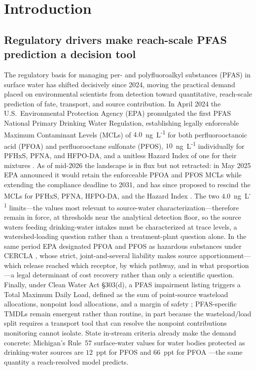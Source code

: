 \section{Introduction}

\subsection{Regulatory drivers make reach-scale PFAS prediction a decision tool}
The regulatory basis for managing per- and polyfluoroalkyl substances (PFAS) in surface water has shifted decisively since 2024, moving the practical demand placed on environmental scientists from detection toward quantitative, reach-scale prediction of fate, transport, and source contribution. In April 2024 the U.S.\ Environmental Protection Agency (EPA) promulgated the first PFAS National Primary Drinking Water Regulation, establishing legally enforceable Maximum Contaminant Levels (MCLs) of $4.0$~ng~L\textsuperscript{-1} for both perfluorooctanoic acid (PFOA) and perfluorooctane sulfonate (PFOS), $10$~ng~L\textsuperscript{-1} individually for PFHxS, PFNA, and HFPO-DA, and a unitless Hazard Index of one for their mixtures \citep[89~Fed.~Reg.~32532;][]{epa2024mcl}. As of mid-2026 the landscape is in flux but not retracted: in May 2025 EPA announced it would retain the enforceable PFOA and PFOS MCLs while extending the compliance deadline to 2031, and has since proposed to rescind the MCLs for PFHxS, PFNA, HFPO-DA, and the Hazard Index \citep{epa2025mcl}. The two $4.0$~ng~L\textsuperscript{-1} limits---the values most relevant to source-water characterization---therefore remain in force, at thresholds near the analytical detection floor, so the source waters feeding drinking-water intakes must be characterized at trace levels, a watershed-loading question rather than a treatment-plant question alone. In the same period EPA designated PFOA and PFOS as hazardous substances under CERCLA \citep[89~Fed.~Reg.~39124;][]{epa2024cercla}, whose strict, joint-and-several liability makes source apportionment---which release reached which receptor, by which pathway, and in what proportion---a legal determinant of cost recovery rather than only a scientific question. Finally, under Clean Water Act \S303(d), a PFAS impairment listing triggers a Total Maximum Daily Load, defined as the sum of point-source wasteload allocations, nonpoint load allocations, and a margin of safety \citep{epatmdl}; PFAS-specific TMDLs remain emergent rather than routine, in part because the wasteload/load split requires a transport tool that can resolve the nonpoint contributions monitoring cannot isolate. State in-stream criteria already make the demand concrete: Michigan's Rule~57 surface-water values for water bodies protected as drinking-water sources are $12$~ppt for PFOS and $66$~ppt for PFOA \citep{egle2022rule57,egle2023rule57}---the same quantity a reach-resolved model predicts.

